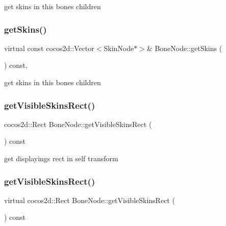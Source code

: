 get skins in this bone\textquotesingle{}s children \mbox{\label{classBoneNode_ad1e49b0e034dc298bcc8cf349c820584}} 
\subsubsection{\texorpdfstring{get\+Skins()}{getSkins()}\hspace{0.1cm}{\footnotesize\ttfamily [2/2]}}
{\footnotesize\ttfamily virtual const cocos2d\+::\+Vector$<$Skin\+Node$\ast$$>$\& Bone\+Node\+::get\+Skins (\begin{DoxyParamCaption}{ }\end{DoxyParamCaption}) const\hspace{0.3cm}{\ttfamily [inline]}, {\ttfamily [virtual]}}

get skins in this bone\textquotesingle{}s children \mbox{\label{classBoneNode_a9307c4303a4e01793ecc2af93d856aa7}} 
\subsubsection{\texorpdfstring{get\+Visible\+Skins\+Rect()}{getVisibleSkinsRect()}\hspace{0.1cm}{\footnotesize\ttfamily [1/2]}}
{\footnotesize\ttfamily cocos2d\+::\+Rect Bone\+Node\+::get\+Visible\+Skins\+Rect (\begin{DoxyParamCaption}{ }\end{DoxyParamCaption}) const\hspace{0.3cm}{\ttfamily [virtual]}}

get displayings rect in self transform \mbox{\label{classBoneNode_aba6034b071dcce0ee5d2afdb440bf5e5}} 
\subsubsection{\texorpdfstring{get\+Visible\+Skins\+Rect()}{getVisibleSkinsRect()}\hspace{0.1cm}{\footnotesize\ttfamily [2/2]}}
{\footnotesize\ttfamily virtual cocos2d\+::\+Rect Bone\+Node\+::get\+Visible\+Skins\+Rect (\begin{DoxyParamCaption}{ }\end{DoxyParamCaption}) const\hspace{0.3cm}{\ttfamily [virtual]}}

